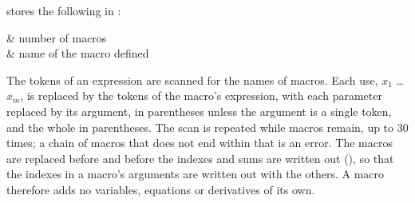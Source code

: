 
 stores the following in :
\begin{storedres}
 & number of macros\\
 & name of the macro defined\\
\end{storedres}


The tokens of an expression are scanned for the names of macros. Each use,
\cmd{(}$x_1$\cmd{,} \dots\cmd{,} $x_m$\cmd{)}, is replaced by the
tokens of the macro's expression, with each parameter replaced by its
argument, in parentheses unless the argument is a single token, and the
whole in parentheses. The scan is repeated while macros remain, up to 30
times; a chain of macros that does not end within that is an error. The
macros are replaced before  and before the indexes and sums are
written out (), so that the indexes in a macro's
arguments are written out with the others. A macro therefore adds no
variables, equations or derivatives of its own.


\begin{alsosee}
\end{alsosee}
